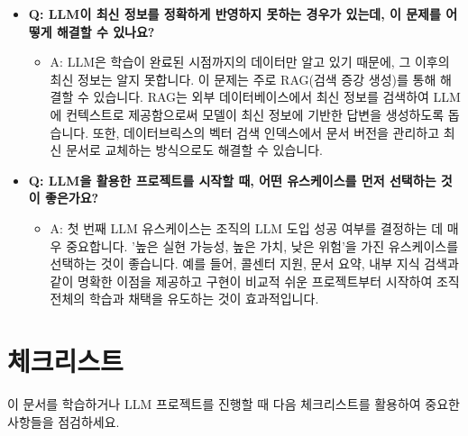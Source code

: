 \documentclass[11pt,a4paper]{article}
\begin{document}
\begin{itemize}
    \item \textbf{Q: LLM이 최신 정보를 정확하게 반영하지 못하는 경우가 있는데, 이 문제를 어떻게 해결할 수 있나요?}
    \begin{itemize}
        \item A: LLM은 학습이 완료된 시점까지의 데이터만 알고 있기 때문에, 그 이후의 최신 정보는 알지 못합니다. 이 문제는 주로 RAG(검색 증강 생성)를 통해 해결할 수 있습니다. RAG는 외부 데이터베이스에서 최신 정보를 검색하여 LLM에 컨텍스트로 제공함으로써 모델이 최신 정보에 기반한 답변을 생성하도록 돕습니다. 또한, 데이터브릭스의 벡터 검색 인덱스에서 문서 버전을 관리하고 최신 문서로 교체하는 방식으로도 해결할 수 있습니다.
    \end{itemize}

    \item \textbf{Q: LLM을 활용한 프로젝트를 시작할 때, 어떤 유스케이스를 먼저 선택하는 것이 좋은가요?}
    \begin{itemize}
        \item A: 첫 번째 LLM 유스케이스는 조직의 LLM 도입 성공 여부를 결정하는 데 매우 중요합니다. '높은 실현 가능성, 높은 가치, 낮은 위험'을 가진 유스케이스를 선택하는 것이 좋습니다. 예를 들어, 콜센터 지원, 문서 요약, 내부 지식 검색과 같이 명확한 이점을 제공하고 구현이 비교적 쉬운 프로젝트부터 시작하여 조직 전체의 학습과 채택을 유도하는 것이 효과적입니다.
    \end{itemize}
\end{itemize}

\newpage
\section{체크리스트}

이 문서를 학습하거나 LLM 프로젝트를 진행할 때 다음 체크리스트를 활용하여 중요한 사항들을 점검하세요.
\end{document}
